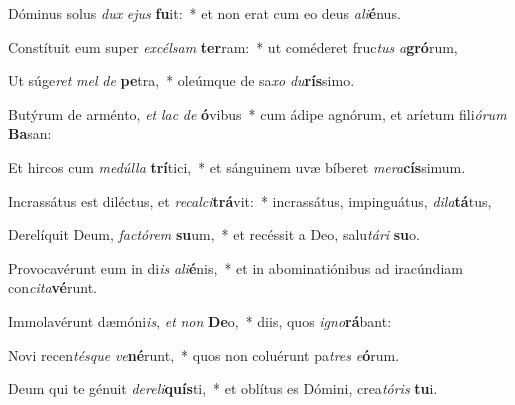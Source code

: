 \item Dóminus solus \textit{dux} \textit{e}\textit{jus} \textbf{fu}it:~* et non erat cum eo deus \textit{a}\textit{li}\textbf{é}nus.
\item Constítuit eum super \textit{ex}\textit{cél}\textit{sam} \textbf{ter}ram:~* ut coméderet fruc\textit{tus} \textit{a}\textbf{gró}rum,
\item Ut súge\textit{ret} \textit{mel} \textit{de} \textbf{pe}tra,~* oleúmque de sa\textit{xo} \textit{du}\textbf{rís}simo.
\item Butýrum de arménto, \textit{et} \textit{lac} \textit{de} \textbf{ó}vibus~* cum ádipe agnórum, et aríetum fili\textit{ó}\textit{rum} \textbf{Ba}san:
\item Et hircos cum \textit{me}\textit{dúl}\textit{la} \textbf{trí}tici,~* et sánguinem uvæ bíberet \textit{me}\textit{ra}\textbf{cís}simum.
\item Incrassátus est diléctus, et \textit{re}\textit{cal}\textit{ci}\textbf{trá}vit:~* incrassátus, impinguátus, \textit{di}\textit{la}\textbf{tá}tus,
\item Derelíquit Deum, \textit{fac}\textit{tó}\textit{rem} \textbf{su}um,~* et recéssit a Deo, salu\textit{tá}\textit{ri} \textbf{su}o.
\item Provocavérunt eum in di\textit{is} \textit{a}\textit{li}\textbf{é}nis,~* et in abominatiónibus ad iracúndiam con\textit{ci}\textit{ta}\textbf{vé}runt.
\item Immolavérunt dæmóni\textit{is}, \textit{et} \textit{non} \textbf{De}o,~* diis, quos \textit{i}\textit{gno}\textbf{rá}bant:
\item Novi recen\textit{tés}\textit{que} \textit{ve}\textbf{né}runt,~* quos non coluérunt pa\textit{tres} \textit{e}\textbf{ó}rum.
\item Deum qui te génuit \textit{de}\textit{re}\textit{li}\textbf{quís}ti,~* et oblítus es Dómini, crea\textit{tó}\textit{ris} \textbf{tu}i.
